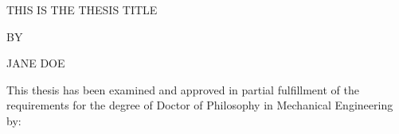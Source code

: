 \documentclass[12pt]{unhthesis}
\begin{document}
\thispagestyle{empty}
\mainmatter

\begin{center}
    THIS IS THE THESIS TITLE
    \vspace{6mm}

    BY
    \vspace{6mm}

    JANE DOE
    \vspace{6mm}
\end{center}

\noindent \small{This thesis has been examined and approved in partial
fulfillment of the requirements for the degree of Doctor of Philosophy in
Mechanical Engineering by:}

\begin{tabular}{l}

\end{tabular}
\end{document}
